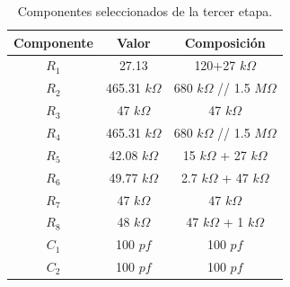 \begin{multicols}{2}
\begin{table}[H]
\centering
\begin{tabular}{ccc}
\hline
\multicolumn{1}{c}{Componente} & \multicolumn{1}{c}{Valor} & Composición \\ \hline
$R_1$                           & 27.13                      & 120+27 $k\Omega$     \\
$R_2$                           & 465.31 $k\Omega$                    & 680 $k\Omega$ // 1.5 $M\Omega$  \\
$R_3$                           & 47 $k\Omega$                        & 47 $k\Omega$         \\
$R_4$                           & 465.31 $k\Omega$                    & 680 $k\Omega$ // 1.5 $M\Omega$  \\
$R_5$                           & 42.08 $k\Omega$                     & 15 $k\Omega$ + 27 $k\Omega$     \\
$R_6$                           & 49.77 $k\Omega$                     & 2.7 $k\Omega$ + 47 $k\Omega$    \\
$R_7$                           & 47 $k\Omega$                        & 47 $k\Omega$         \\
$R_8$                           & 48 $k\Omega$                        & 47 $k\Omega$ + 1 $k\Omega$         \\
$C_1$                           & 100 $pf$                       & 100 $pf$        \\
$C_2$                           & 100 $pf$                       & 100 $pf$        \\
\hline
\end{tabular}
\caption{Componentes seleccionados de la tercer etapa.}
\end{table}


\end{multicols}
